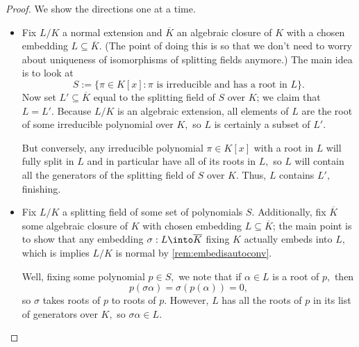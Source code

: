 \documentclass[../notes.tex]{subfiles}
\begin{document}
\begin{proof}
	We show the directions one at a time.
	\begin{itemize}
		\item Fix $L/K$ a normal extension and $\overline K$ an algebraic closure of $K$ with a chosen embedding $L\subseteq\overline K.$ (The point of doing this is so that we don't need to worry about uniqueness of isomorphisms of splitting fields anymore.) The main idea is to look at
		\[S:=\{\pi\in K[x]:\pi\text{ is irreducible and has a root in }L\}.\]
		Now set $L'\subseteq\overline K$ equal to the splitting field of $S$ over $K$; we claim that $L=L'.$ Because $L/K$ is an algebraic extension, all elements of $L$ are the root of some irreducible polynomial over $K,$ so $L$ is certainly a subset of $L'.$

		But conversely, any irreducible polynomial $\pi\in K[x]$ with a root in $L$ will fully split in $L$ and in particular have all of its roots in $L,$ so $L$ will contain all the generators of the splitting field of $S$ over $K.$ Thus, $L$ contains $L',$ finishing.

		\item Fix $L/K$ a splitting field of some set of polynomials $S.$ Additionally, fix $\overline K$ some algebraic closure of $K$ with chosen embedding $L\subseteq\overline K$; the main point is to show that any embedding $\sigma:L\into\overline K$ fixing $K$ actually embeds into $L,$ which is implies $L/K$ is normal by \autoref{rem:embedisautoconv}.

		Well, fixing some polynomial $p\in S,$ we note that if $\alpha\in L$ is a root of $p,$ then
		\[p(\sigma\alpha)=\sigma(p(\alpha))=0,\]
		so $\sigma$ takes roots of $p$ to roots of $p.$ However, $L$ has all the roots of $p$ in its list of generators over $K,$ so $\sigma\alpha\in L.$


\end{itemize}
\end{proof}
\end{document}
